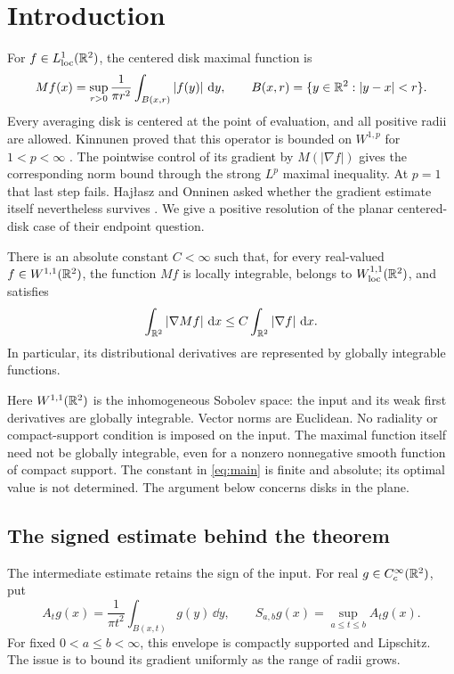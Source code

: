 \section{Introduction}\label{sec:introduction}

For $f\in L^1_{\mathrm{loc}}(\mathbb R^2)$, the centered disk maximal function is
\[
 Mf(x)=\sup_{r>0}\frac1{\pi r^2}\int_{B(x,r)}|f(y)|\,\mathop{}\!\mathrm{d} y,
 \qquad B(x,r)=\{y\in\mathbb R^2:|y-x|<r\}.
\]
Every averaging disk is centered at the point of evaluation, and all
positive radii are allowed. Kinnunen proved that this operator is
bounded on $W^{1,p}$ for $1<p<\infty$
\cite[Theorem~1.4]{Kinnunen1997}. The pointwise control of its gradient
by $M(|\nabla f|)$ gives the corresponding norm bound through the
strong $L^p$ maximal inequality. At $p=1$ that last step fails.
Haj{\l}asz and Onninen asked whether the gradient estimate itself
nevertheless survives \cite[Question~1]{HajlaszOnninen2004}.
We give a positive resolution of the planar centered-disk case of
their endpoint question.

\begin{theorem}\label{thm:main}
There is an absolute constant $C<\infty$ such that, for every
real-valued $f\in W^{1,1}(\mathbb R^2)$, the function $Mf$ is locally
integrable, belongs to $W^{1,1}_{\mathrm{loc}}(\mathbb R^2)$, and satisfies
\begin{equation}\label{eq:main}
 \int_{\mathbb R^2}|\nabla Mf|\,\mathop{}\!\mathrm{d} x
 \le C\int_{\mathbb R^2}|\nabla f|\,\mathop{}\!\mathrm{d} x.
\end{equation}
In particular, its distributional derivatives are represented by
globally integrable functions.
\end{theorem}

Here $W^{1,1}(\mathbb R^2)$ is the inhomogeneous Sobolev space: the input and
its weak first derivatives are globally integrable. Vector norms are
Euclidean. No radiality or compact-support condition is imposed on
the input. The maximal function itself need not be globally
integrable, even for a nonzero nonnegative smooth function of compact
support. The constant in \eqref{eq:main} is finite and absolute; its
optimal value is not determined. The argument below concerns disks
in the plane.

\subsection{The signed estimate behind the theorem}

The intermediate estimate retains the sign of the input. For real
$g\in C_c^\infty(\mathbb R^2)$, put
\[
 A_tg(x)=\frac1{\pi t^2}\int_{B(x,t)}g(y)\,\dd y,
 \qquad S_{a,b}g(x)=\sup_{a\le t\le b}A_tg(x).
\]
For fixed $0<a\le b<\infty$, this envelope is compactly supported and
Lipschitz. The issue is to bound its gradient uniformly as the range
of radii grows.

